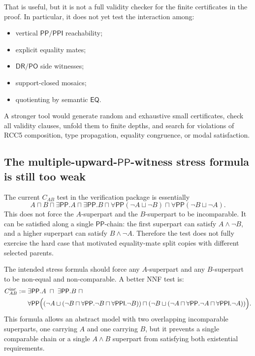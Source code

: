 \documentclass[11pt]{article}
\newcommand{\PP}{\mathsf{PP}}
\newcommand{\PPI}{\mathsf{PPI}}
\newcommand{\PO}{\mathsf{PO}}
\newcommand{\DR}{\mathsf{DR}}
\newcommand{\EQ}{\mathsf{EQ}}
\begin{document}
That is useful, but it is not a full validity checker for the finite certificates in the proof.  In particular, it does not yet test the interaction among:
\begin{itemize}
\item vertical \(\PP/\PPI\) reachability;
\item explicit equality mates;
\item \(\DR/\PO\) side witnesses;
\item support-closed mosaics;
\item quotienting by semantic \(\EQ\).
\end{itemize}

A stronger tool would generate random and exhaustive small certificates, check all validity clauses, unfold them to finite depths, and search for violations of RCC5 composition, type propagation, equality congruence, or modal satisfaction.

\subsection{The multiple-upward-\(\PP\)-witness stress formula is still too weak}

The current \(C_{AB}\) test in the verification package is essentially
\[
A\sqcap B\sqcap \exists\PP.A\sqcap\exists\PP.B
\sqcap \forall\PP(\neg A\sqcup\neg B)
\sqcap \forall\PP(\neg B\sqcup\neg A).
\]
This does not force the \(A\)-superpart and the \(B\)-superpart to be incomparable.  It can be satisfied along a single \(\PP\)-chain: the first superpart can satisfy \(A\wedge\neg B\), and a higher superpart can satisfy \(B\wedge\neg A\).  Therefore the test does not fully exercise the hard case that motivated equality-mate split copies with different selected parents.

The intended stress formula should force any \(A\)-superpart and any \(B\)-superpart to be non-equal and non-comparable.  A better NNF test is:
\[
\begin{aligned}
C^{\mathrm{inc}}_{AB}:={}&
\exists\PP.A\ \sqcap\ \exists\PP.B\ \sqcap \\
&\forall\PP\Bigl(
  (\neg A\sqcup(\neg B\sqcap\forall\PP.\neg B\sqcap\forall\PPI.\neg B))
  \sqcap
  (\neg B\sqcup(\neg A\sqcap\forall\PP.\neg A\sqcap\forall\PPI.\neg A))
\Bigr).
\end{aligned}
\]
This formula allows an abstract model with two overlapping incomparable superparts, one carrying \(A\) and one carrying \(B\), but it prevents a single comparable chain or a single \(A\wedge B\) superpart from satisfying both existential requirements.
\end{document}

